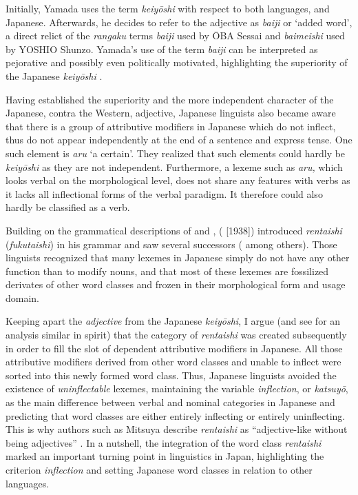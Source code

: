 \documentclass[output=paper,colorlinks,citecolor=brown]{langscibook}
\begin{document}
Initially, Yamada uses the term \emph{keiyōshi} with respect to both languages,  and Japanese. Afterwards, he decides to refer to the  adjective as \emph{baiji} or `added word', a direct relict of the \emph{rangaku} terms \emph{baiji} used by ŌBA Sessai and \emph{baimeishi} used by YOSHIO Shunzo. Yamada's use of the term \emph{baiji} can be interpreted as pejorative and possibly even politically motivated, highlighting the superiority of the Japanese \emph{keiyōshi} \citep{kim2006}.

Having established the superiority and the more independent character of the Japanese, contra the Western, adjective, Japanese linguists also became aware that there is a group of attributive modifiers in Japanese which do not inflect, thus do not appear independently at the end of a sentence and express tense. One such element is \emph{aru} `a certain'. They realized that such elements could hardly be \emph{keiyōshi} as they are not independent. Furthermore, a lexeme such as \emph{aru,} which looks verbal on the morphological level, does not share any features with verbs as it lacks all inflectional forms of the verbal paradigm. It therefore could also hardly be classified as a verb.

Building on the grammatical descriptions of \citet{otsuki1891} and \citet{yamada1908}, \citeauthor{matsushita1976} (\citeyear{matsushita1976} [1938]) introduced \emph{rentaishi} (\emph{fukutaishi}) in his grammar and saw several successors (\citealt{sekine1937, kieda1938} among others). Those linguists recognized that many lexemes in Japanese simply do not have any other function than to modify nouns, and that most of these lexemes are fossilized derivates of other word classes and frozen in their morphological form and usage domain.

Keeping apart the  \emph{adjective} from the Japanese \emph{keiyōshi}, I argue (and see \citealt{kim2006} for an analysis similar in spirit) that the category of \emph{rentaishi} was created subsequently in order to fill the slot of dependent attributive modifiers in Japanese. All those attributive modifiers derived from other word classes and unable to inflect were sorted into this newly formed word class. Thus, Japanese linguists avoided the existence of \emph{uninflectable} lexemes, maintaining the variable \emph{inflection}, or \emph{katsuyō}, as the main difference between verbal and nominal categories in Japanese and predicting that word classes are either entirely inflecting or entirely uninflecting. This is why authors such as Mitsuya describe \emph{rentaishi} as ``adjective-like without being adjectives'' \citep[238]{mitsuya1932}. In a nutshell, the integration of the word class \emph{rentaishi} marked an important turning point in linguistics in Japan, highlighting the criterion \emph{inflection} and setting Japanese word classes in relation to other languages.
\end{document}
